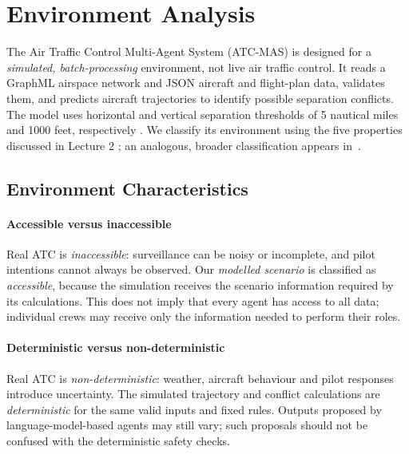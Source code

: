 \section{Environment Analysis}\label{sec:environment}

The Air Traffic Control Multi-Agent System (ATC-MAS) is designed for a
\emph{simulated, batch-processing} environment, not live air traffic control.
It reads a GraphML airspace network and JSON aircraft and flight-plan data,
validates them, and predicts aircraft trajectories to identify possible
separation conflicts. The model uses horizontal and vertical separation
thresholds of 5 nautical miles and 1000 feet, respectively \cite{icao4444}. We classify
its environment using the five properties discussed in Lecture 2
\cite{urvlect2,wooldridge2009}; an analogous, broader classification appears in~\cite{russell2020}.

\subsection{Environment Characteristics}

\paragraph{Accessible versus inaccessible}
Real ATC is \emph{inaccessible}: surveillance can be noisy or incomplete,
and pilot intentions cannot always be observed. Our \emph{modelled scenario}
is classified as \emph{accessible}, because the simulation receives the
scenario information required by its calculations. This does not imply
that every agent has access to all data; individual crews may receive only
the information needed to perform their roles.

\paragraph{Deterministic versus non-deterministic}
Real ATC is \emph{non-deterministic}: weather, aircraft behaviour and pilot
responses introduce uncertainty. The simulated trajectory and conflict
calculations are \emph{deterministic} for the same valid inputs and fixed
rules. Outputs proposed by language-model-based agents may still vary;
such proposals should not be confused with the deterministic safety checks.

